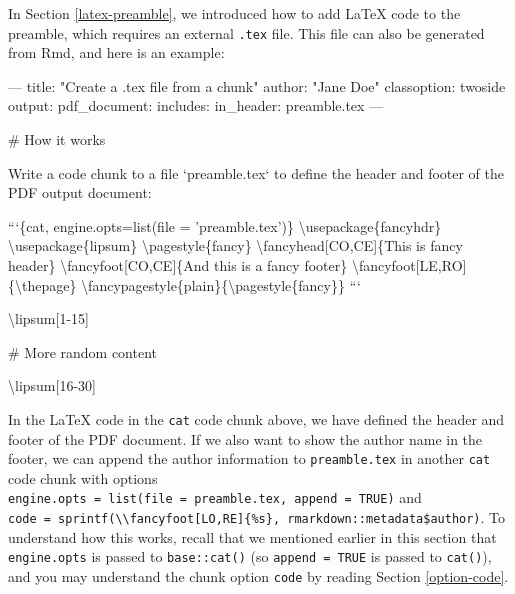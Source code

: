 \documentclass[
  11pt,
]{krantz}
\newenvironment{Shaded}{\begin{snugshade}}{\end{snugshade}}
\newcommand{\BaseNTok}[1]{\textcolor[rgb]{0.06,0.06,0.06}{#1}}
\newcommand{\FunctionTok}[1]{\textcolor[rgb]{0,0,0}{#1}}
\newcommand{\NormalTok}[1]{#1}
\begin{document}
In Section \ref{latex-preamble}, we introduced how to add LaTeX code to the preamble, which requires an external \texttt{.tex} file. This file can also be generated from Rmd, and here is an example:

\begin{Shaded}
\begin{Highlighting}[]
\NormalTok{---}
\NormalTok{title: "Create a .tex file from a chunk"}
\NormalTok{author: "Jane Doe"}
\NormalTok{classoption: twoside}
\NormalTok{output: }
\NormalTok{  pdf_document:}
\BaseNTok{    includes:}
\BaseNTok{      in_header: preamble.tex}
\NormalTok{---}

\FunctionTok{# How it works}

\NormalTok{Write a code chunk to a file }\BaseNTok{`preamble.tex`}\NormalTok{ to define}
\NormalTok{the header and footer of the PDF output document:}

\BaseNTok{```\{cat, engine.opts=list(file = 'preamble.tex')\}}
\BaseNTok{\textbackslash{}usepackage\{fancyhdr\}}
\BaseNTok{\textbackslash{}usepackage\{lipsum\}}
\BaseNTok{\textbackslash{}pagestyle\{fancy\}}
\BaseNTok{\textbackslash{}fancyhead[CO,CE]\{This is fancy header\}}
\BaseNTok{\textbackslash{}fancyfoot[CO,CE]\{And this is a fancy footer\}}
\BaseNTok{\textbackslash{}fancyfoot[LE,RO]\{\textbackslash{}thepage\}}
\BaseNTok{\textbackslash{}fancypagestyle\{plain\}\{\textbackslash{}pagestyle\{fancy\}\}}
\BaseNTok{```}

\NormalTok{\textbackslash{}lipsum[1-15]}

\FunctionTok{# More random content}

\NormalTok{\textbackslash{}lipsum[16-30]}
\end{Highlighting}
\end{Shaded}

In the LaTeX code in the \texttt{cat} code chunk above, we have defined the header and footer of the PDF document. If we also want to show the author name in the footer, we can append the author information to \texttt{preamble.tex} in another \texttt{cat} code chunk with options \texttt{engine.opts\ =\ list(file\ =\ \textquotesingle{}preamble.tex\textquotesingle{},\ append\ =\ TRUE)} and \texttt{code\ =\ sprintf(\textquotesingle{}\textbackslash{}\textbackslash{}fancyfoot{[}LO,RE{]}\{\%s\}\textquotesingle{},\ rmarkdown::metadata\$author)}. To understand how this works, recall that we mentioned earlier in this section that \texttt{engine.opts} is passed to \texttt{base::cat()} (so \texttt{append\ =\ TRUE} is passed to \texttt{cat()}), and you may understand the chunk option \texttt{code} by reading Section \ref{option-code}.
\end{document}
